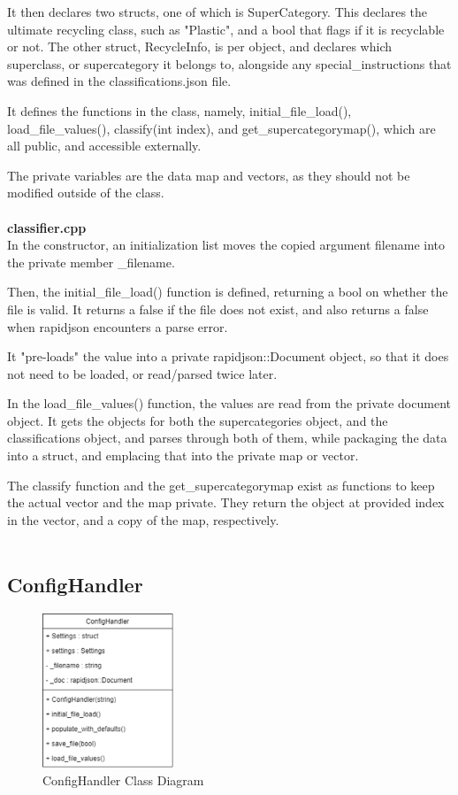 \documentclass[conference]{IEEEtran}
\begin{document}
It then declares two structs, one of which is SuperCategory. This declares the ultimate recycling class, such as "Plastic", and a bool that flags if it is recyclable or not. The other struct, RecycleInfo, is per object, and declares which superclass, or supercategory it belongs to, alongside any special\_instructions that was defined in the classifications.json file. 

It defines the functions in the class, namely, initial\_file\_load(), load\_file\_values(), classify(int index), and get\_supercategorymap(), which are all public, and accessible externally.

The private variables are the data map and vectors, as they should not be modified outside of the class.~\\~\\


\textbf{classifier.cpp}~\\

In the constructor, an initialization list moves the copied argument filename into the private member \_filename. 

Then, the initial\_file\_load() function is defined, returning a bool on whether the file is valid. It returns a false if the file does not exist, and also returns a false when rapidjson encounters a parse error.

It "pre-loads" the value into a private rapidjson::Document object, so that it does not need to be loaded, or read/parsed twice later.

In the load\_file\_values() function, the values are read from the private document object. It gets the objects for both the supercategories object, and the classifications object, and parses through both of them, while packaging the data into a struct, and emplacing that into the private map or vector.

The classify function and the get\_supercategorymap exist as functions to keep the actual vector and the map private. They return the object at provided index in the vector, and a copy of the map, respectively.~\\~\\


\subsection{ConfigHandler}

\begin{figure}[h]
    \centering
    \includegraphics[width=0.35\textwidth]{images/code_diagrams/confighandler_uml.eps}
    \caption{ConfigHandler Class Diagram}
\end{figure}~\\
\end{document}

